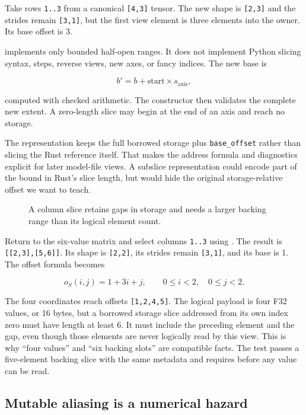 \documentclass[
  10pt,
]{article}
\begin{document}
Take rows \texttt{1..3} from a canonical \texttt{{[}4,3{]}} tensor. The
new shape is \texttt{{[}2,3{]}} and the strides remain
\texttt{{[}3,1{]}}, but the first view element is three elements into
the owner. Its base offset is 3.

\texttt{} implements only bounded
half-open ranges. It does not implement Python slicing syntax, steps,
reverse views, new axes, or fancy indices. The new base is

\[
b' = b + \text{start}\times s_{\text{axis}},
\]

computed with checked arithmetic. The constructor then validates the
complete new extent. A zero-length slice may begin at the end of an axis
and reach no storage.

The representation keeps the full borrowed storage plus
\texttt{base\_offset} rather than slicing the Rust reference itself.
That makes the address formula and diagnostics explicit for later
model-file views. A subslice representation could encode part of the
bound in Rust's slice length, but would hide the original
storage-relative offset we want to teach.

\begin{figure}[H]\centering\resizebox{\linewidth}{!}{}\caption{A column slice retains gaps in storage and needs a larger backing range than its logical element count.}\end{figure}

Return to the six-value matrix and select columns \texttt{1..3} using
\texttt{}. The result is
\texttt{{[}{[}2,3{]},{[}5,6{]}{]}}. Its shape is \texttt{{[}2,2{]}}, its
strides remain \texttt{{[}3,1{]}}, and its base is 1. The offset formula
becomes

\[
o_S(i,j)=1+3i+j,\qquad 0\le i<2,\quad 0\le j<2.
\]

The four coordinates reach offsets \texttt{{[}1,2,4,5{]}}. The logical
payload is four F32 values, or 16 bytes, but a borrowed storage slice
addressed from its own index zero must have length at least 6. It must
include the preceding element and the gap, even though those elements
are never logically read by this view. This is why ``four values'' and
``six backing slots'' are compatible facts. The test passes a
five-element backing slice with the same metadata and requires
\texttt{} before any value can be read.

\subsection{Mutable aliasing is a numerical
hazard}\label{mutable-aliasing-is-a-numerical-hazard}
\end{document}
